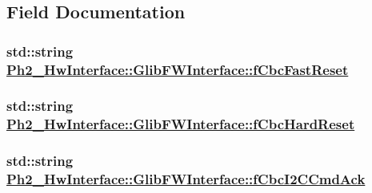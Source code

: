 \subsection{Field Documentation}
\hypertarget{class_ph2___hw_interface_1_1_glib_f_w_interface_16633bf7e8c4d61cacd8a6862673221c}{
\subsubsection[fCbcFastReset]{\setlength{\rightskip}{0pt plus 5cm}std::string \hyperlink{class_ph2___hw_interface_1_1_glib_f_w_interface_16633bf7e8c4d61cacd8a6862673221c}{Ph2\_\-Hw\-Interface::Glib\-FWInterface::f\-Cbc\-Fast\-Reset}}}
\label{class_ph2___hw_interface_1_1_glib_f_w_interface_16633bf7e8c4d61cacd8a6862673221c}


\hypertarget{class_ph2___hw_interface_1_1_glib_f_w_interface_c7410b226fffc5a361386f6e6c3b96e0}{
\subsubsection[fCbcHardReset]{\setlength{\rightskip}{0pt plus 5cm}std::string \hyperlink{class_ph2___hw_interface_1_1_glib_f_w_interface_c7410b226fffc5a361386f6e6c3b96e0}{Ph2\_\-Hw\-Interface::Glib\-FWInterface::f\-Cbc\-Hard\-Reset}}}
\label{class_ph2___hw_interface_1_1_glib_f_w_interface_c7410b226fffc5a361386f6e6c3b96e0}


\hypertarget{class_ph2___hw_interface_1_1_glib_f_w_interface_a2c87823ad0d9c2da49526eeef10c8e6}{
\subsubsection[fCbcI2CCmdAck]{\setlength{\rightskip}{0pt plus 5cm}std::string \hyperlink{class_ph2___hw_interface_1_1_glib_f_w_interface_a2c87823ad0d9c2da49526eeef10c8e6}{Ph2\_\-Hw\-Interface::Glib\-FWInterface::f\-Cbc\-I2CCmd\-Ack}}}
\label{class_ph2___hw_interface_1_1_glib_f_w_interface_a2c87823ad0d9c2da49526eeef10c8e6}


